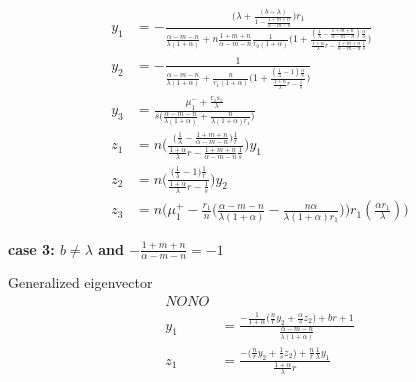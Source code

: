 \documentclass[a4paper,11pt]{article}
\begin{document}
\begin{align*}
 y_1&=-\frac{\Big(\lambda + \frac{(b-\lambda)}{1-\frac{1+m+n}{\alpha-m-n}}\Big)r_1}{\frac{\alpha-m-n}{\lambda(1+\alpha)} + n\frac{1+m+n}{\alpha-m-n}\frac{1}{r_0(1+\alpha)}\Big(1 + \frac{(\frac{1}{\lambda}-\frac{1+m+n}{\alpha-m-n})\frac{\alpha}{s}}{ \frac{1+\alpha}{\lambda}r -\frac{1+m+n}{\alpha-m-n} \frac{1}{s} }\Big) }\\
 y_2&=-\frac{1}{\frac{\alpha-m-n}{\lambda(1+\alpha)} + \frac{n}{r_1(1+\alpha)}\Big(1 + \frac{(\frac{1}{\lambda}-1)\frac{\alpha}{s}}{ \frac{1+\alpha}{\lambda}r - \frac{1}{s} }\Big) }\\
 y_3&=\frac{\mu_1^- +\frac{r_1s_1}{\lambda}}{s\Big(\frac{\alpha-m-n}{\lambda(1+\alpha)} + \frac{n}{\lambda(1+\alpha)r_1}\Big)}\\
 z_1&=n\bigg(\frac{\big(\frac{1}{\lambda}-\frac{1+m+n}{\alpha-m-n}\big)\frac{1}{r}}{ \frac{1+\alpha}{\lambda}r -\frac{1+m+n}{\alpha-m-n} \frac{1}{s} }\bigg)y_1 \\
 z_2&=n\bigg(\frac{\big(\frac{1}{\lambda}-1\big)\frac{1}{r}}{ \frac{1+\alpha}{\lambda}r - \frac{1}{s} }\bigg)y_2 \\
 z_3&=n\bigg(\mu_1^+-\frac{r_1}{n}\Big(\frac{\alpha-m-n}{\lambda(1+\alpha)} - \frac{n\alpha}{\lambda(1+\alpha)r_1}\Big)\bigg)r_1(\frac{\alpha r_1}{\lambda})\bigg)
\end{align*}


{\bf case 3: $b\ne\lambda$ and $-\frac{1+m+n}{\alpha-m-n}= -1$}

Generalized eigenvector
\begin{align*}
NONO\\
 y_1 &= \frac{-\frac{1}{1+\alpha}\Big(\frac{n}{r}y_2 +\frac{\alpha}{s}z_2\Big) + br + 1}{\frac{\alpha-m-n}{\lambda(1+\alpha)}}\\
 z_1 &= \frac{-\Big(\frac{n}{r}y_2 +\frac{1}{s}z_2\Big)+ \frac{n}{r}\frac{1}{\lambda}y_1}{\frac{1+\alpha}{\lambda}r}
\end{align*}



\end{document}
